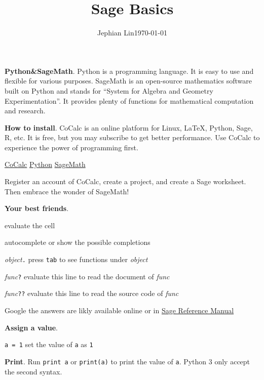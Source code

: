 \documentclass{article}
\title{Sage Basics}
\author{Jephian Lin\hspace{2cm}\today}
\date{\vspace{-1cm}}
\newcommand{\heading}[1]{\medskip\textbf{#1}.}
\newenvironment{lwdes}{\begin{description}[leftmargin=1.7cm,align=left,labelwidth=1.5cm]}{\end{description}}
\begin{document}
\maketitle

\large

\begin{multicols}{2}
\heading{Python\&SageMath}  Python is a programming language.  It is easy to use and flexible for various purposes.  SageMath is an open-source mathematics software built on Python and stands for ``System for Algebra and Geometry Experimentation''.  It provides plenty of functions for mathematical computation and research.

\heading{How to install}  CoCalc is an online platform for Linux, \LaTeX{}, Python, Sage, R, etc.  It is free, but you may subscribe to get better performance.  Use CoCalc to experience the power of programming first.  
\begin{center}
\href{https://cocalc.com/}{CoCalc}
\hfil
\href{https://www.python.org/}{Python}
\hfil
\href{http://www.sagemath.org/}{SageMath}
\end{center}
Register an account of CoCalc, create a project, and create a Sage worksheet.  Then embrace the wonder of SageMath!

\heading{Your best friends}
\begin{lwdes}
\item[\stackanchor{\keys{shift}}{+\keys{enter}}] evaluate the cell
\item[\keys{tab}] autocomplete or show the possible completions
\item[\textit{object}\texttt{.}] press \texttt{tab} to see functions under \textit{object}
\item[\textit{func}\texttt{?}] evaluate this line to read the document of \textit{func}
\item[\textit{func}\texttt{??}] evaluate this line to read the source code of \textit{func} 
\item[Google] the answers are likly available online or in \href{https://doc.sagemath.org/html/en/reference/}{Sage Reference Manual}
\end{lwdes}

\heading{Assign a value}
\begin{lwdes}
\item[\texttt{a = 1}] set the value of \texttt{a} as \texttt{1}
\end{lwdes}

\heading{Print}
Run \texttt{print a} or \texttt{print(a)} to print the value of \texttt{a}.  Python 3 only accept the second syntax.
\columnbreak


\end{multicols}
\end{document}
